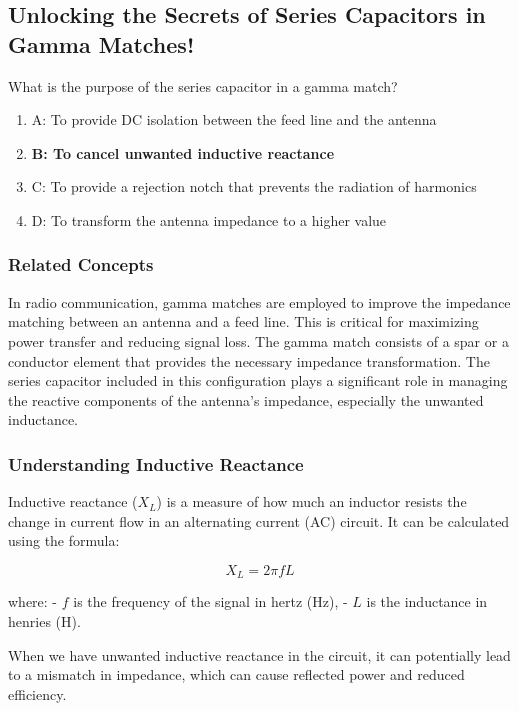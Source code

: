 \subsection{Unlocking the Secrets of Series Capacitors in Gamma Matches!}

\begin{tcolorbox}[colback=gray!10, colframe=black, title=E9E04]
What is the purpose of the series capacitor in a gamma match? 
\begin{enumerate}
    \item A: To provide DC isolation between the feed line and the antenna
    \item \textbf{B: To cancel unwanted inductive reactance}
    \item C: To provide a rejection notch that prevents the radiation of harmonics
    \item D: To transform the antenna impedance to a higher value
\end{enumerate} \end{tcolorbox}

\subsubsection{Related Concepts}

In radio communication, gamma matches are employed to improve the impedance matching between an antenna and a feed line. This is critical for maximizing power transfer and reducing signal loss. The gamma match consists of a spar or a conductor element that provides the necessary impedance transformation. The series capacitor included in this configuration plays a significant role in managing the reactive components of the antenna's impedance, especially the unwanted inductance.

\subsubsection{Understanding Inductive Reactance}

Inductive reactance ($X_L$) is a measure of how much an inductor resists the change in current flow in an alternating current (AC) circuit. It can be calculated using the formula:

\[
X_L = 2 \pi f L
\]

where:
- \(f\) is the frequency of the signal in hertz (Hz),
- \(L\) is the inductance in henries (H).

When we have unwanted inductive reactance in the circuit, it can potentially lead to a mismatch in impedance, which can cause reflected power and reduced efficiency. 

